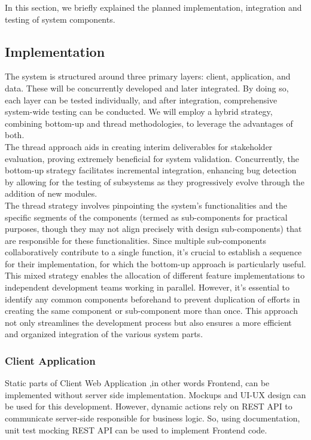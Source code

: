 In this section, we briefly explained the planned implementation, integration and testing of system components. 

\subsection{Implementation}
\indent The system is structured around three primary layers: client, application, and data. These will be concurrently developed and later integrated. By doing so, each layer can be tested individually, and after integration, comprehensive system-wide testing can be conducted. We will employ a hybrid strategy, combining bottom-up and thread methodologies, to leverage the advantages of both.
\\
\indent The thread approach aids in creating interim deliverables for stakeholder evaluation, proving extremely beneficial for system validation. Concurrently, the bottom-up strategy facilitates incremental integration, enhancing bug detection by allowing for the testing of subsystems as they progressively evolve through the addition of new modules.
\\
\indent The thread strategy involves pinpointing the system's functionalities and the specific segments of the components (termed as sub-components for practical purposes, though they may not align precisely with design sub-components) that are responsible for these functionalities. Since multiple sub-components collaboratively contribute to a single function, it's crucial to establish a sequence for their implementation, for which the bottom-up approach is particularly useful.
\\
\indent This mixed strategy enables the allocation of different feature implementations to independent development teams working in parallel. However, it's essential to identify any common components beforehand to prevent duplication of efforts in creating the same component or sub-component more than once. This approach not only streamlines the development process but also ensures a more efficient and organized integration of the various system parts.

\subsubsection{Client Application}
Static parts of Client Web Application ,in other words Frontend, can be implemented without server side implementation. Mockups and UI-UX design can be used for this development. However, dynamic actions rely on REST API to communicate server-side responsible for business logic. So, using documentation, unit test mocking REST API can be used to implement Frontend code.
